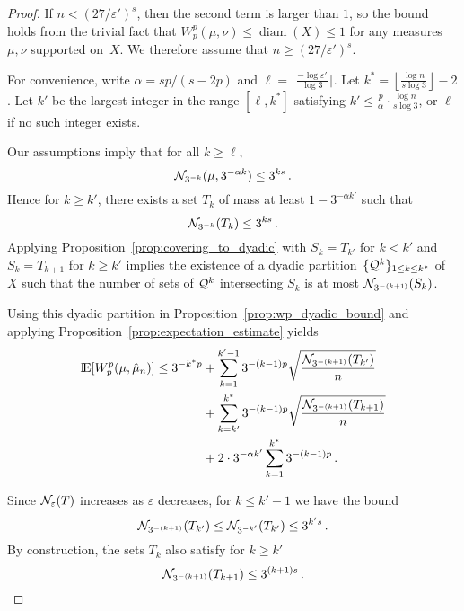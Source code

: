 \documentclass[sts]{imsart}
\newcommand*{\ep}{\varepsilon}
\DeclareMathOperator{\diam}{diam}
\begin{document}
\begin{proof}
If $n < (27/\ep')^s$, then the second term is larger than $1$, so the bound holds from the trivial fact that $W^p_p(\mu, \nu) \leq \diam(X) \leq 1$ for any measures $\mu, \nu$ supported on~$X$.
We therefore assume that $n \geq (27/\ep')^s$.

For convenience, write $\alpha = sp/(s-2p)$ and $\ell = \lceil \frac{- \log \ep'}{\log 3} \rceil$.
Let $k^* = \left \lfloor \frac{\log n}{s \log 3}\right \rfloor - 2$.
Let $k'$ be the largest integer in the range $[\ell, k^*]$ satisfying $k' \leq \frac{p}{\alpha} \cdot \frac{\log n}{s \log 3}$, or $\ell$ if no such integer exists.

Our assumptions imply that for all $k \geq \ell$,
\begin{equation*}
\mathcal{N}_{3^{-k}}(\mu, 3^{-\alpha k}) \leq 3^{k s}\,.
\end{equation*}
Hence for $k \geq k'$, there exists a set $T_k$ of mass at least $1 - 3^{-\alpha k'}$ such that
\begin{equation*}
\mathcal{N}_{3^{-k}}(T_k) \leq 3^{k s}\,.
\end{equation*}
Applying Proposition~\ref{prop:covering_to_dyadic} with $S_k = T_{k'}$ for $k < k'$ and $S_k = T_{k+1}$ for $k \geq k'$ implies the existence of a dyadic partition~$\{\mathcal{Q}^k\}_{1 \leq k \leq k^*}$ of $X$ such that the number of sets of $\mathcal{Q}^k$ intersecting $S_k$ is at most $\mathcal{N}_{3^{-(k+1)}}(S_k)$.


Using this dyadic partition in Proposition~\ref{prop:wp_dyadic_bound} and applying Proposition~\ref{prop:expectation_estimate} yields
\begin{align*}
{\rm I}\kern-0.18em{\rm E}[W^p_p(\mu, \hat \mu_n)] \leq 3^{-k^* p} & + \sum_{k=1}^{k'-1} 3^{-(k-1)p} \sqrt{\frac{\mathcal{N}_{3^{-(k+1)}}(T_{k'})}{n}} \\
 & + \sum_{k=k'}^{k^*} 3^{-(k-1)p} \sqrt{\frac{\mathcal{N}_{3^{-(k+1)}}(T_{k+1})}{n}}\\
 &+ 2 \cdot 3^{-\alpha k'} \sum_{k=1}^{k^*}3^{-(k-1)p}\,.
\end{align*}

Since $\cN_\ep(T)$ increases as $\ep$ decreases, for $k \leq k' -1$ we have the bound
\begin{equation*}
\mathcal{N}_{3^{-(k+1)}}(T_{k'}) \leq \mathcal{N}_{3^{-k'}}(T_{k'}) \leq 3^{k' s}\,.
\end{equation*}
By construction, the sets $T_k$ also satisfy for $k \geq k'$
\begin{equation*}
\mathcal{N}_{3^{-(k+1)}}(T_{k+1}) \leq 3^{(k+1)s}\,.
\end{equation*}


\end{proof}
\end{document}
